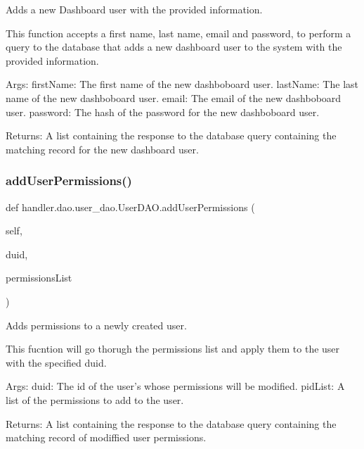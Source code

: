 \begin{DoxyVerb}Adds a new Dashboard user with the provided information.

This function accepts a first name, last name, email and password, 
to perform a query to the database that adds a new dashboard user 
to the system with the provided information.

Args:
    firstName: The first name of the new dashboboard user.
    lastName: The last name of the new dashboboard user.
    email: The email of the new dashboboard user.
    password: The hash of the password for the new dashboboard user.

Returns:
    A list containing the response to the database query
    containing the matching record for the new dashboard user.
\end{DoxyVerb}
 \mbox{\label{classhandler_1_1dao_1_1user__dao_1_1_user_d_a_o_a33142b7d872005517261ea4e56b8e006}} 
\subsubsection{\texorpdfstring{add\+User\+Permissions()}{addUserPermissions()}}
{\footnotesize\ttfamily def handler.\+dao.\+user\+\_\+dao.\+User\+D\+A\+O.\+add\+User\+Permissions (\begin{DoxyParamCaption}\item[{}]{self,  }\item[{}]{duid,  }\item[{}]{permissions\+List }\end{DoxyParamCaption})}

\begin{DoxyVerb}Adds permissions to a newly created user.

This fucntion will go thorugh the permissions list and apply them to 
the user with the specified duid.

Args:
    duid: The id of the user's whose permissions will be modified.
    pidList: A list of the permissions to add to the user.

Returns:
    A list containing the response to the database query containing 
    the matching record of modiffied user permissions.
\end{DoxyVerb}
 \mbox{\label{classhandler_1_1dao_1_1user__dao_1_1_user_d_a_o_af9e5fda379f239935a78b40c95eee115}} 
